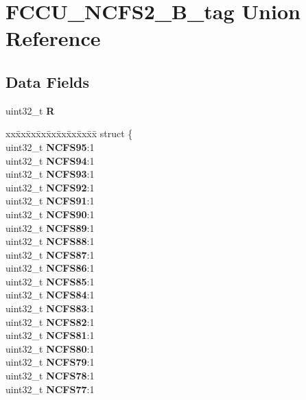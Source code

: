 \hypertarget{unionFCCU__NCFS2__32B__tag}{}\section{F\+C\+C\+U\+\_\+\+N\+C\+F\+S2\+\_\+B\+\_\+tag Union Reference}
\label{unionFCCU__NCFS2__32B__tag}
\subsection*{Data Fields}
\begin{DoxyCompactItemize}
\item 
\mbox{\label{unionFCCU__NCFS2__32B__tag_a4f278c2aab4b68eec16ba6fd15230997}} 
uint32\+\_\+t {\bfseries R}
\item 
\mbox{\label{unionFCCU__NCFS2__32B__tag_a555c8ebb38938f4d6e9ba0c142a1bc51}} 
\begin{tabbing}
xx\=xx\=xx\=xx\=xx\=xx\=xx\=xx\=xx\=\kill
struct \{\\
\>uint32\_t {\bfseries NCFS95}:1\\
\>uint32\_t {\bfseries NCFS94}:1\\
\>uint32\_t {\bfseries NCFS93}:1\\
\>uint32\_t {\bfseries NCFS92}:1\\
\>uint32\_t {\bfseries NCFS91}:1\\
\>uint32\_t {\bfseries NCFS90}:1\\
\>uint32\_t {\bfseries NCFS89}:1\\
\>uint32\_t {\bfseries NCFS88}:1\\
\>uint32\_t {\bfseries NCFS87}:1\\
\>uint32\_t {\bfseries NCFS86}:1\\
\>uint32\_t {\bfseries NCFS85}:1\\
\>uint32\_t {\bfseries NCFS84}:1\\
\>uint32\_t {\bfseries NCFS83}:1\\
\>uint32\_t {\bfseries NCFS82}:1\\
\>uint32\_t {\bfseries NCFS81}:1\\
\>uint32\_t {\bfseries NCFS80}:1\\
\>uint32\_t {\bfseries NCFS79}:1\\
\>uint32\_t {\bfseries NCFS78}:1\\
\>uint32\_t {\bfseries NCFS77}:1\\

\end{tabbing}
\end{DoxyCompactItemize}
